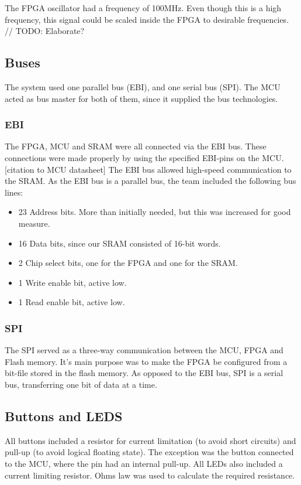 The FPGA oscillator had a frequency of 100MHz.
Even though this is a high frequency, this signal could be scaled inside the FPGA to desirable frequencies. // TODO: Elaborate?

\subsection{Buses}
The system used one parallel bus (EBI), and one serial bus (SPI).
The MCU acted as bus master for both of them, since it supplied the bus technologies.

\subsubsection{EBI}
The FPGA, MCU and SRAM were all connected via the EBI bus.
These connections were made properly by using the specified EBI-pins on the MCU. [citation to MCU datasheet]
The EBI bus allowed high-speed communication to the SRAM.
As the EBI bus is a parallel bus, the team included the following bus lines:
\begin{itemize}
\item 23 Address bits. More than initially needed, but this was increased for good measure.
\item 16 Data bits, since our SRAM consisted of 16-bit words.
\item 2 Chip select bits, one for the FPGA and one for the SRAM.
\item 1 Write enable bit, active low.
\item 1 Read enable bit, active low.
\end{itemize}

\subsubsection{SPI}
The SPI served as a three-way communication between the MCU, FPGA and Flash memory.
It's main purpose was to make the FPGA be configured from a bit-file stored in the flash memory.
As opposed to the EBI bus, SPI is a serial bus, transferring one bit of data at a time.

\subsection{Buttons and LEDS}
All buttons included a resistor for current limitation (to avoid short circuits) and pull-up (to avoid logical floating state).
The exception was the button connected to the MCU, where the pin had an internal pull-up.
All LEDs also included a current limiting resistor. 
Ohms law was used to calculate the required resistance\cite{ohm}.

